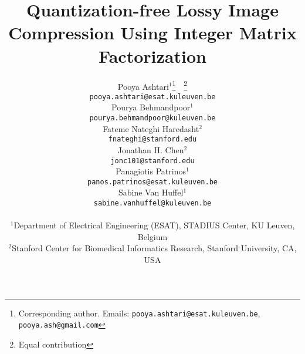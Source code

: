 \documentclass{article}
\title{Quantization-free Lossy Image Compression Using Integer Matrix Factorization}
\author{%
Pooya Ashtari$^{1}$\thanks{Corresponding author. Emails: \texttt{pooya.ashtari@esat.kuleuven.be}, \texttt{pooya.ash@gmail.com}}\ \ \thanks{Equal contribution} \\
\texttt{pooya.ashtari@esat.kuleuven.be} \\
\vspace{-20pt}
\And
Pourya Behmandpoor$^{1}$\footnotemark[2] \\
\texttt{pourya.behmandpoor@kuleuven.be} \\
\vspace{-20pt}
\And
Fateme Nateghi Haredasht$^{2}$ \\
\texttt{fnateghi@stanford.edu} \\
\vspace{-20pt}
\And
Jonathan H. Chen$^{2}$ \\
\texttt{jonc101@stanford.edu} \\
\vspace{-20pt}
\And
Panagiotis Patrinos$^{1}$ \\
\texttt{panos.patrinos@esat.kuleuven.be} \\
\And
Sabine Van Huffel$^{1}$ \\
\texttt{sabine.vanhuffel@kuleuven.be} \\
\And
\vspace{-20pt} \\
\small{$^{1}$Department of Electrical Engineering (ESAT), STADIUS Center, KU Leuven, Belgium} \\
\small{$^{2}$Stanford Center for Biomedical Informatics Research, Stanford University, CA, USA} \\
}
\begin{document}
\maketitle

















\medskip

{
\small


}



\appendix




\end{document}

